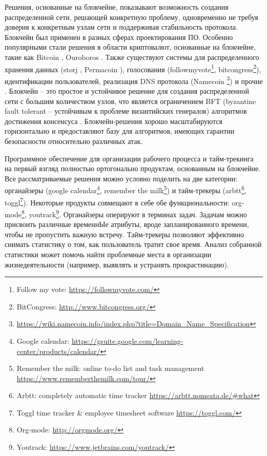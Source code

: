\documentclass[specification,annotation]{itmo-student-thesis}
\begin{document}

\tableofcontents

\startprefacepage

Решения, основанные на блокчейне, показывают возможность создания
распределенной сети, решающей конкретную проблему, одновременно не
требуя доверия к конкретным узлам сети и поддерживая стабильность
протокола. Блокчейн был применен в разных сферах проектирования
ПО. Особенно популярными стали решения в области криптовалют,
основанные на блокчейне, такие как Bitcoin \cite{bitcoin}, Ouroboros
\cite{ouroboros}. Также существуют системы для распределенного
хранения данных (storj \cite{wilkinson2014storj}, Permacoin
\cite{permacoin}), голосования (followmyvote\footnote{Follow my vote:
  \url{https://followmyvote.com/}}, bitcongress\footnote{BitCongress:
  \url{http://www.bitcongress.org/}}), идентификации пользователей,
реализация DNS протокола
(Namecoin \footnote{\url{https://wiki.namecoin.info/index.php?title=Domain_Name_Specification}})
и прочие \cite{swan2015blockchain}. Блокчейн -- это простое и
устойчивое решение для создания распределенной сети с большим
количеством узлов, что является ограничением BFT (byzantine fault
tolerant -- устойчивым к проблеме византийских генералов) алгоритмов
достижения консенсуса \cite{powbftquest}. Блокчейн-решения хорошо
масштабируются горизонтально и предоставляют базу для алгоритмов,
имеющих гарантии безопасности относительно различных атак.

Программное обеспечение для организации рабочего процесса и
тайм-трекинга на первый взгляд полностью ортогонально продуктам,
основанным на блокчейне. Все рассматриваемые решения можно условно
поделить на две категории: органайзеры (google
calendar\footnote{Google calendar:
  \url{https://gsuite.google.com/learning-center/products/calendar/}},
remember the milk\footnote{Remember the milk: online to-do list and
  task management \url{https://www.rememberthemilk.com/tour/}}) и
тайм-трекеры (arbtt\footnote{Arbtt: completely automatic time tracker
  \url{https://arbtt.nomeata.de/#what}}, toggl\footnote{Toggl time
  tracker \& employee timesheet software
  \url{https://toggl.com/}}). Некоторые продукты совмещают в себе обе
функциональности: org-mode\footnote{Org-mode:
  \url{http://orgmode.org/}}, youtrack\footnote{ Youtrack:
  \url{https://www.jetbrains.com/youtrack/}}. Органайзеры оперируют в
терминах задач. Задачам можно присвоить различные временнЫе атрибуты,
вроде запланированного времени, чтобы не пропустить важную
встречу. Тайм-трекеры позволяют эффективно снимать статистику о том,
как пользователь тратит свое время. Анализ собранной статистики может
помочь найти проблемные места в организации жизнедеятельности
(например, выявлять и устранять прокрастинацию).
\end{document}
